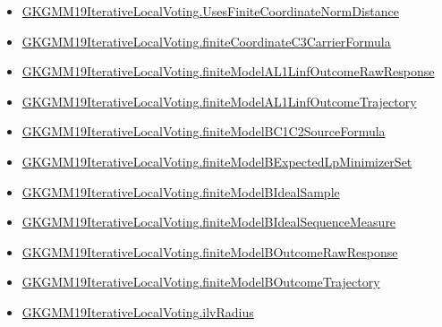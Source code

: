 \documentclass[10pt]{article}
\begin{document}
\begin{itemize}
\item \hyperlink{governing-declaration-f3282f086fe40a02}{GKGMM19\allowbreak{}Iterative\allowbreak{}Local\allowbreak{}Voting.\allowbreak{}Uses\allowbreak{}Finite\allowbreak{}Coordinate\allowbreak{}Norm\allowbreak{}Distance}
\item \hyperlink{governing-declaration-0c1cf5a4d5b33561}{GKGMM19\allowbreak{}Iterative\allowbreak{}Local\allowbreak{}Voting.\allowbreak{}finite\allowbreak{}Coordinate\allowbreak{}C3\allowbreak{}Carrier\allowbreak{}Formula}
\item \hyperlink{governing-declaration-61e4a0002818544e}{GKGMM19\allowbreak{}Iterative\allowbreak{}Local\allowbreak{}Voting.\allowbreak{}finite\allowbreak{}Model\allowbreak{}AL1\allowbreak{}Linf\allowbreak{}Outcome\allowbreak{}Raw\allowbreak{}Response}
\item \hyperlink{governing-declaration-fdfeb9d871d65d8b}{GKGMM19\allowbreak{}Iterative\allowbreak{}Local\allowbreak{}Voting.\allowbreak{}finite\allowbreak{}Model\allowbreak{}AL1\allowbreak{}Linf\allowbreak{}Outcome\allowbreak{}Trajectory}
\item \hyperlink{governing-declaration-e2a0dd5d6886b3ec}{GKGMM19\allowbreak{}Iterative\allowbreak{}Local\allowbreak{}Voting.\allowbreak{}finite\allowbreak{}Model\allowbreak{}BC1\allowbreak{}C2\allowbreak{}Source\allowbreak{}Formula}
\item \hyperlink{governing-declaration-eeb1da390534fafb}{GKGMM19\allowbreak{}Iterative\allowbreak{}Local\allowbreak{}Voting.\allowbreak{}finite\allowbreak{}Model\allowbreak{}B\allowbreak{}Expected\allowbreak{}Lp\allowbreak{}Minimizer\allowbreak{}Set}
\item \hyperlink{governing-declaration-41e1ceb0696b5f21}{GKGMM19\allowbreak{}Iterative\allowbreak{}Local\allowbreak{}Voting.\allowbreak{}finite\allowbreak{}Model\allowbreak{}B\allowbreak{}Ideal\allowbreak{}Sample}
\item \hyperlink{governing-declaration-4a521de5e9fb0dd0}{GKGMM19\allowbreak{}Iterative\allowbreak{}Local\allowbreak{}Voting.\allowbreak{}finite\allowbreak{}Model\allowbreak{}B\allowbreak{}Ideal\allowbreak{}Sequence\allowbreak{}Measure}
\item \hyperlink{governing-declaration-82ace23264ae173e}{GKGMM19\allowbreak{}Iterative\allowbreak{}Local\allowbreak{}Voting.\allowbreak{}finite\allowbreak{}Model\allowbreak{}B\allowbreak{}Outcome\allowbreak{}Raw\allowbreak{}Response}
\item \hyperlink{governing-declaration-afdf8d45bd28d786}{GKGMM19\allowbreak{}Iterative\allowbreak{}Local\allowbreak{}Voting.\allowbreak{}finite\allowbreak{}Model\allowbreak{}B\allowbreak{}Outcome\allowbreak{}Trajectory}
\item \hyperlink{governing-declaration-2cfd8c76662024e1}{GKGMM19\allowbreak{}Iterative\allowbreak{}Local\allowbreak{}Voting.\allowbreak{}ilv\allowbreak{}Radius}
\end{itemize}
\end{document}

